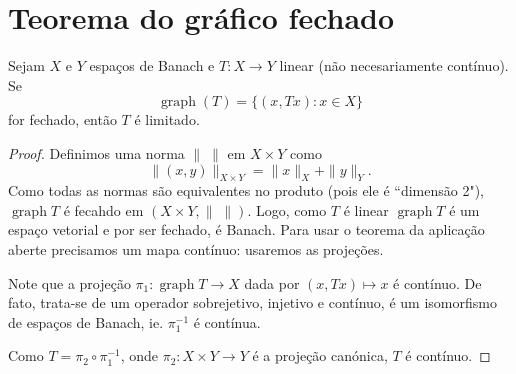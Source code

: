 \documentclass[portuguese]{article}
\theoremstyle{definition}
\begin{document}
\section{Teorema do gráfico fechado}
\begin{teo}
	Sejam $X$ e $Y$ espaços de Banach e $T:X\to Y$ linear (não necesariamente contínuo). Se
	\[\operatorname{graph}(T)=\{(x,Tx):x\in X\}\]
	for fechado, então $T$ é limitado.
\end{teo}
\begin{proof}
	Definimos uma norma $\|\;\|$ em $X\times Y$ como
	\[\|(x,y)\|_{X\times Y}=\|x\|_X+\|y\|_Y.\]
	Como todas as normas são equivalentes no produto (pois ele é ``dimensão 2"), $\operatorname{graph}T$ é fecahdo em $(X\times Y,\|\;\|)$. Logo, como $T$ é linear $\operatorname{graph}T$ é um espaço vetorial e por ser fechado, é Banach. Para usar o teorema da aplicação aberte precisamos um mapa contínuo: usaremos as projeções.
	
	Note que a projeção $\pi_1:\operatorname{graph}T\to X$ dada por $(x,Tx)\mapsto x$ é contínuo. De fato, trata-se de um operador sobrejetivo, injetivo e contínuo, é um isomorfismo de espaços de Banach, ie. $\pi_1^{-1}$ é contínua.
	
	Como $T=\pi_2\circ\pi_1^{-1}$, onde $\pi_2:X\times Y\to Y$ é a projeção canónica, $T$ é contínuo.
\end{proof}
\end{document}
